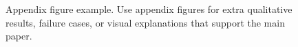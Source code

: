 \begin{figure}[ht]
  \centering
  \caption{Appendix figure example. Use appendix figures for extra qualitative
  results, failure cases, or visual explanations that support the main paper.}
  \label{fig:app_extra_figure}
\end{figure}
